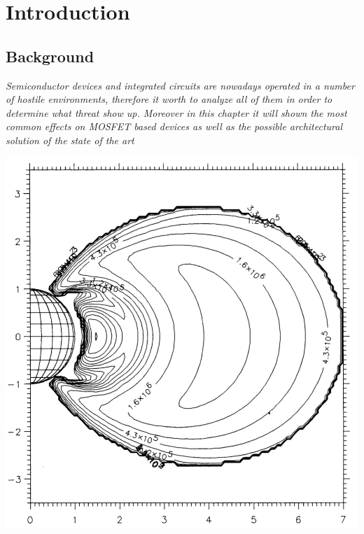 \documentclass[./dissertation.tex]{subfiles}
\begin{document}
\part{Introduction}
\chapter{Background}
\label{chap:fond}

\begin{minipage}{12cm}\textit{Semiconductor devices and integrated circuits are nowadays operated in a number of hostile environments, therefore it worth to analyze all of them in order to determine what threat show up. Moreover in this chapter it will shown the most common effects on MOSFET based devices as well as the possible architectural solution of the state of the art}

\end{minipage}

\vspace{1.30cm}
\begin{center}
    \includegraphics[scale=0.40]{Figures/radiation.png}
\end{center}
\vspace*{1cm}
\newpage
\end{document}
